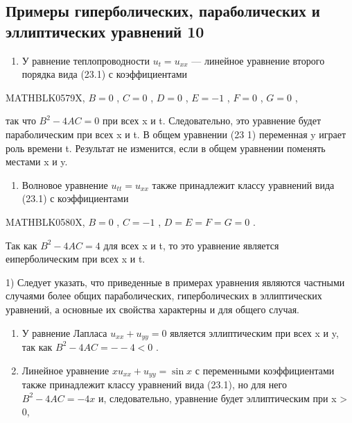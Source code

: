 \documentclass[
  ukrainian,
]{article}
\providecommand{\tightlist}{%
  \setlength{\itemsep}{0pt}\setlength{\parskip}{0pt}}
\begin{document}
\subsection{Примеры гиперболических, параболических и эллиптических
уравнений
10}\label{ux43fux440ux438ux43cux435ux440ux44b-ux433ux438ux43fux435ux440ux431ux43eux43bux438ux447ux435ux441ux43aux438ux445-ux43fux430ux440ux430ux431ux43eux43bux438ux447ux435ux441ux43aux438ux445-ux438-ux44dux43bux43bux438ux43fux442ux438ux447ux435ux441ux43aux438ux445-ux443ux440ux430ux432ux43dux435ux43dux438ux439-10-1}

\begin{enumerate}
\def\labelenumi{\arabic{enumi}.}
\tightlist
\item
  У равнение теплопроводности \(u_t = u_{xx}\) --- линейное уравнение
  второго порядка вида (23.1) с коэффициентами
\end{enumerate}

MATHBLK0579X, \(B=0\) , \(C=0\) , \(D=0\) , \(E=-1\) , \(F=0\) , \(G=0\)
,

так что \(B^2-4AC=0\) при всех x и t. Следовательно, это уравнение будет
параболическим при всех x и t. В общем уравнении (23 1) переменная y
играет роль времени t. Результат не изменится, если в общем уравнении
поменять местами x и y.

\begin{enumerate}
\def\labelenumi{\arabic{enumi}.}
\setcounter{enumi}{1}
\tightlist
\item
  Волновое уравнение \(u_{tt} = u_{xx}\) также принадлежит классу
  уравнений вида (23.1) с коэффициентами
\end{enumerate}

MATHBLK0580X, \(B=0\) , \(C=-1\) , \(D=E=F=G=0\) .

Так как \(B^2 - 4AC = 4\) для всех x и t, то это уравнение является
еиперболическим при всех x и t.

1) Следует указать, что приведенные в примерах уравнения являются
частными случаями более общих параболических, гиперболических в
эллиптических уравнений, а основные их свойства характерны и для общего
случая.

\begin{enumerate}
\def\labelenumi{\arabic{enumi}.}
\setcounter{enumi}{2}
\item
  У равнение Лапласа \(u_{xx} + u_{yy} = 0\) является эллиптическим при
  всех x и y, так как \(B^2 - 4AC = - - 4 < 0\) .
\item
  Линейное уравнение \(xu_{xx} + u_{yy} = \sin x\) с переменными
  коэффициентами также принадлежит классу уравнений вида (23.1), но для
  него \(B^2-4AC=-4x\) и, следовательно, уравнение будет эллиптическим
  при x \textgreater{} 0,
\end{enumerate}
\end{document}
